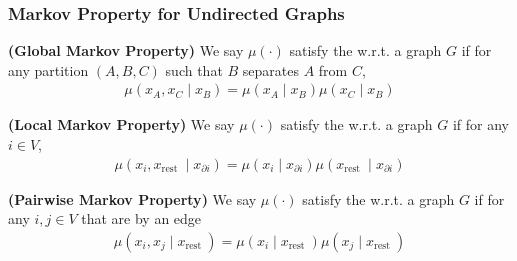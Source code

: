 \documentclass{article}
\newcommand{\bfs}[1]{\textbf{({#1}) }}
\begin{document}
\subsubsection{Markov Property for Undirected Graphs}
\begin{defa}\bfs{Global Markov Property}
 We say $\mu(\cdot)$ satisfy the  w.r.t. a graph $G$ if for any partition $(A, B, C)$ such that $B$ separates $A$ from $C$,
\begin{align*}
\mu\left(x_{A}, x_{C} \mid x_{B}\right)=\mu\left(x_{A} \mid x_{B}\right) \mu\left(x_{C} \mid x_{B}\right)
\end{align*}
\end{defa}
\begin{defa}\bfs{Local Markov Property}
 We say $\mu(\cdot)$ satisfy the   w.r.t. a graph $G$ if for any $i \in V$,
\begin{align*}
\mu\left(x_{i}, x_{\text {rest }} \mid x_{\partial i}\right)=\mu\left(x_{i} \mid x_{\partial i}\right) \mu\left(x_{\text {rest }} \mid x_{\partial i}\right)
\end{align*}
\end{defa}
\begin{defa}\bfs{Pairwise Markov Property}
 We say $\mu(\cdot)$ satisfy the   w.r.t. a graph $G$ if for any $i, j \in V$ that are  by an edge
\begin{align*}
\mu\left(x_{i}, x_{j} \mid x_{\text {rest }}\right)=\mu\left(x_{i} \mid x_{\text {rest }}\right) \mu\left(x_{j} \mid x_{\text {rest }}\right)
\end{align*}
\end{defa}
\end{document}
